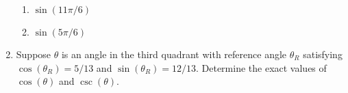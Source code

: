 \begin{enumerate}
\begin{enumerate}
\item $\sin(11\pi/6)$ \vfill
\item $\sin(5\pi/6)$ \vfill
\end{enumerate}



\item Suppose $\theta$ is an angle in the third quadrant with reference angle $\theta_R$ satisfying $\cos(\theta_R)=5/13$ and $\sin(\theta_R)=12/13$.  Determine the exact values of $\cos(\theta)$ and $\csc(\theta)$.  \vfill
\vfill


%

\end{enumerate}

